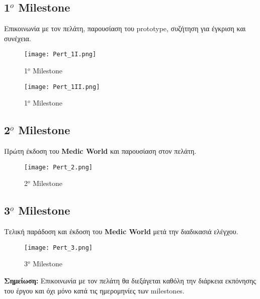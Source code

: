 \documentclass{article}
\begin{document}
\subsection{1$^o$ Milestone}

Επικοινωνία με τον πελάτη, παρουσίαση του prototype, συζήτηση για έγκριση και συνέχεια.

\vspace{0.3cm}

\begin{figure}[!htb]
\centering
\texttt{[image: Pert\_1I.png]}
\caption{\label{fig:Pert1} 1$^o$ Milestone}
\end{figure}

\newpage

\begin{figure}[!htb]
\centering
\texttt{[image: Pert\_1II.png]}
\caption{\label{fig:Pert2} 1$^o$ Milestone}
\end{figure}

\subsection{2$^o$ Milestone}

Πρώτη έκδοση του \textbf{Medic World} και παρουσίαση στον πελάτη.

\vspace{0.3cm}

\begin{figure}[!htb]
\centering
\texttt{[image: Pert\_2.png]}
\caption{\label{fig:Pert3} 2$^o$ Milestone}
\end{figure}

\newpage

\subsection{3$^o$ Milestone}

Τελική παράδοση και έκδοση του \textbf{Medic World} μετά την διαδικασιά ελέγχου.

\vspace{0.3cm}

\begin{figure}[!htb]
\centering
\texttt{[image: Pert\_3.png]}
\caption{\label{fig:Pert4} 3$^o$ Milestone}
\end{figure}

\vspace{0.5cm}

\textbf{Σημείωση:} Επικοινωνία με τον πελάτη θα διεξάγεται καθόλη την διάρκεια εκπόνησης του έργου και όχι μόνο κατά τις ημερομηνίες των milestones.
\end{document}
